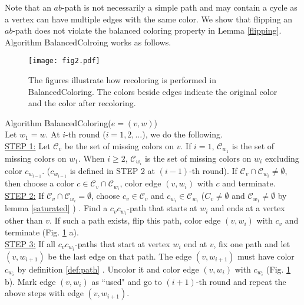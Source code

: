 \documentclass[titlepage, 11pt]{article}
\begin{document}
Note that an $ab$-path is not necessarily a simple path and may contain a cycle as a vertex can have multiple edges with the same color.
We show that flipping an $ab$-path does not violate the balanced coloring property in Lemma \ref{flipping}.
Algorithm {\sc BalancedColroing} works as follows. \\


\begin{figure}[t]
\begin{center}
    \centerline{\texttt{[image: fig2.pdf]}}
    \caption{\small The figures illustrate how recoloring is performed in {\sc BalancedColoring}. The colors beside edges
indicate the original color and the color after recoloring. \vspace{-0.3in}}
 \label{fig:phaseone}
 \end{center}
\end{figure}

\noindent Algorithm {\sc BalancedColoring($e = (v, w)$}) \\
Let $w_1 = w$. At $i$-th round ($i = 1, 2, \dots$), we do the following. \\
\underline{STEP 1:} Let $\mathcal{C}_v$ be the set of missing colors on $v$.
If $i=1$, $\mathcal{C}_{w_1}$ is the set of missing colors on $w_1$. 
When $i \ge 2$, ${\mathcal{C}_{w_i}}$ is  the set of missing colors on $w_i$ excluding color $c_{w_{i-1}}$.
($c_{w_{i-1}}$ is defined in STEP 2 at $(i-1)$-th round).
If $\mathcal{C}_v \cap \mathcal{C}_{w_i} \ne \emptyset$, 
then choose a color $c \in \mathcal{C}_v \cap \mathcal{C}_{w_i}$, color edge $(v,w_i)$ with $c$ and terminate. \\
\underline{STEP 2:} If $\mathcal{C}_v \cap \mathcal{C}_{w_i} = \emptyset$, choose $c_v \in \mathcal{C}_v$ and $c_{w_i} \in \mathcal{C}_{w_i}$ ($C_v \neq \emptyset$ and  $\mathcal{C}_{w_1} \neq \emptyset$ by lemma \ref{saturated} ) . Find a $c_vc_{w_i}$-path that starts at $w_i$ and ends at a vertex other than $v$. If such a path exists, flip this path, color edge $(v,w_i)$ with $c_v$ and terminate (Fig. \ref{fig:phaseone} a).\\
\underline{STEP 3:} If all $c_vc_{w_i}$-paths that start at vertex $w_i$ end at $v$, fix one path and let $(v,w_{i+1})$ be the last edge on that path. The edge $(v,w_{i+1})$ must have color $c_{w_i}$ by definition \ref{def:path} . Uncolor it and color edge $(v,w_i)$ with $c_{w_i}$ (Fig. \ref{fig:phaseone} b). Mark edge $(v,w_i)$ as ``used" and go to $(i+1)$-th round and repeat the above steps with edge $(v, w_{i+1})$.
\end{document}
